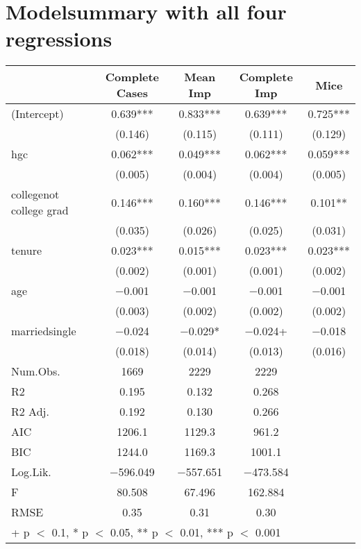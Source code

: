 \documentclass{article}
\begin{document}
\section{Modelsummary with all four regressions}
\begin{table}[H]
\centering
\begin{tabular}[t]{lcccc}
\toprule
  & Complete Cases & Mean Imp & Complete Imp & Mice\\
\midrule
(Intercept) & \num{0.639}*** & \num{0.833}*** & \num{0.639}*** & \num{0.725}***\\
 & (\num{0.146}) & (\num{0.115}) & (\num{0.111}) & (\num{0.129})\\
hgc & \num{0.062}*** & \num{0.049}*** & \num{0.062}*** & \num{0.059}***\\
 & (\num{0.005}) & (\num{0.004}) & (\num{0.004}) & (\num{0.005})\\
collegenot college grad & \num{0.146}*** & \num{0.160}*** & \num{0.146}*** & \num{0.101}**\\
 & (\num{0.035}) & (\num{0.026}) & (\num{0.025}) & (\num{0.031})\\
tenure & \num{0.023}*** & \num{0.015}*** & \num{0.023}*** & \num{0.023}***\\
 & (\num{0.002}) & (\num{0.001}) & (\num{0.001}) & (\num{0.002})\\
age & \num{-0.001} & \num{-0.001} & \num{-0.001} & \num{-0.001}\\
 & (\num{0.003}) & (\num{0.002}) & (\num{0.002}) & (\num{0.002})\\
marriedsingle & \num{-0.024} & \num{-0.029}* & \num{-0.024}+ & \num{-0.018}\\
 & (\num{0.018}) & (\num{0.014}) & (\num{0.013}) & (\num{0.016})\\
\midrule
Num.Obs. & \num{1669} & \num{2229} & \num{2229} & \\
R2 & \num{0.195} & \num{0.132} & \num{0.268} & \\
R2 Adj. & \num{0.192} & \num{0.130} & \num{0.266} & \\
AIC & \num{1206.1} & \num{1129.3} & \num{961.2} & \\
BIC & \num{1244.0} & \num{1169.3} & \num{1001.1} & \\
Log.Lik. & \num{-596.049} & \num{-557.651} & \num{-473.584} & \\
F & \num{80.508} & \num{67.496} & \num{162.884} & \\
RMSE & \num{0.35} & \num{0.31} & \num{0.30} & \\
\bottomrule
\multicolumn{5}{l}{\rule{0pt}{1em}+ p $<$ 0.1, * p $<$ 0.05, ** p $<$ 0.01, *** p $<$ 0.001}\\
\end{tabular}
\end{table}
\end{document}

